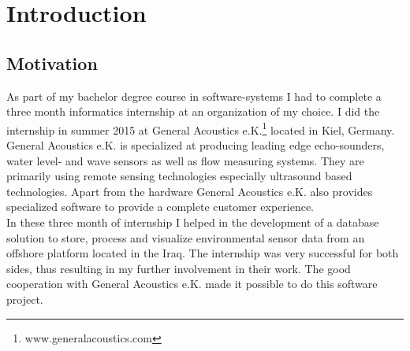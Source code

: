 \chapter{Introduction}

\section{Motivation}
As part of my bachelor degree course in software-systems I had to complete a three month informatics internship at an organization of my choice. I did the internship in summer 2015 at General Acoustics e.K.\footnote{\label{foot:1} www.generalacoustics.com} located in Kiel, Germany. General Acoustics e.K. is specialized at producing leading edge echo-sounders, water level- and wave sensors as well as flow measuring systems. They are primarily using remote sensing technologies especially ultrasound based technologies. Apart from the hardware General Acoustics e.K. also provides specialized software to provide a complete customer experience.\\
In these three month of internship I helped in the development of a database solution to store, process and visualize environmental sensor data from an offshore platform located in the Iraq. The internship was very successful for both sides, thus resulting in my further involvement in their work. The good cooperation with General Acoustics e.K. made it possible to do this software project.%

